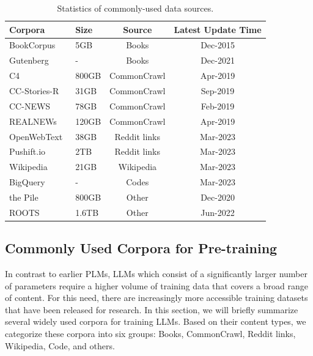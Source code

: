 {{{\begin{table}[htbp]
    \centering
    \caption{Statistics of commonly-used data sources. }
    \label{tab:corpora}
    \footnotesize
    \renewcommand\tabcolsep{2.5pt}
    \begin{tabular}{llcc}
    \toprule
    {\textbf{Corpora}} & {\textbf{Size}} &  {\textbf{Source}} & {\textbf{Latest Update Time}} \\
    \midrule
    BookCorpus~\cite{Zhu-ICCV-2015-Aligning} & 5GB   & Books    & Dec-2015 \\
    Gutenberg~\cite{Gutenberg}   & -    & Books    & Dec-2021 \\ 
    C4~\cite{Raffel-JMLR-2020-Exploring}  & 800GB    & CommonCrawl  & Apr-2019 \\
    CC-Stories-R~\cite{Trinh-CoRR-2018-A}  & 31GB    & CommonCrawl  & Sep-2019 \\
    CC-NEWS~\cite{Liu-CoRR-2019-RoBERTa} & 78GB  & CommonCrawl  & Feb-2019 \\
    REALNEWs~\cite{Zellers-NeurIPS-2019-Defending}    & 120GB & CommonCrawl  & Apr-2019 \\
    OpenWebText~\cite{Gokaslan2019OpenWeb} & 38GB  & Reddit links & Mar-2023 \\
    Pushift.io~\cite{Baumgartner-AAAI-2020-The}  & 2TB    & Reddit links & Mar-2023 \\
    Wikipedia~\cite{Wikipedia}   & 21GB    & Wikipedia    & Mar-2023 \\
    BigQuery~\cite{bigquery-google}    & -    & Codes    & Mar-2023 \\
    the Pile~\cite{Gao-arxiv-2021-Pile} & 800GB & Other    & Dec-2020 \\
    ROOTS~\cite{Laurencon-NIPS-2022-The}   & 1.6TB & Other    & Jun-2022 \\ 
    \bottomrule
    \end{tabular}
    \label{tab:methods}
\end{table}


\subsection{Commonly Used Corpora for Pre-training}
\label{sec:commonly_used_corpora}
{In contrast to earlier PLMs, LLMs which consist of a significantly larger number of parameters require a higher volume of training data that covers a broad range of content. For this need, there are increasingly more accessible training datasets that have been released for research.   
In this section, we will briefly summarize several widely used corpora for training LLMs. } 
Based on their content types, we categorize these corpora into six groups: Books, CommonCrawl, Reddit links, Wikipedia, Code, and others.


}}}
